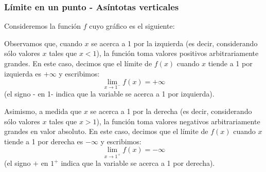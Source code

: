 \documentclass[../teoria.root.tex]{subfiles}
\begin{document}
\subsubsection{Límite en un punto - Asíntotas verticales}
Consideremos la función \(f\) cuyo gráfico es el siguiente:
\begin{center}
\end{center}
Observamos que, cuando \(x\) se acerca a 1 por la izquierda (es decir, considerando sólo valores \(x\) tales que \(x<1\)), la función toma valores positivos arbitrariamente grandes.
En este caso, decimos que el límite de \(f(x)\) cuando \(x\) tiende a 1 por izquierda es \(+\infty\) y escribimos:
\[\lim_{x\to1^-}f(x)=+\infty\]
(el signo - en 1- indica que la variable se acerca a 1 por izquierda).

Asimismo, a medida que \(x\) se acerca a 1 por la derecha (es decir, considerando sólo valores \(x\) tales que \(x>1\)), la función toma valores negativos arbitrariamente grandes en valor absoluto.
En este caso, decimos que el límite de \(f(x)\) cuando \(x\) tiende a 1 por derecha es \(-\infty\) y escribimos:
\[\lim_{x\to1^+}f(x)=-\infty\]
(el signo \(+\) en \(1^+\) indica que la variable se acerca a 1 por derecha).
\end{document}
